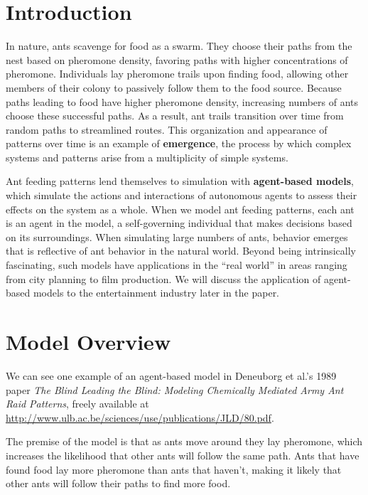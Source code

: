 
\newcommand\upquote[1]{\textquotesingle#1\textquotesingle}


\section{Introduction}

In nature, ants scavenge for food as a swarm. They choose their paths from the nest based on pheromone density, favoring paths with higher concentrations of pheromone.  Individuals lay pheromone trails upon finding food, allowing other members of their colony to passively follow them to the food source.  Because paths leading to food have higher pheromone density, increasing numbers of ants choose these successful paths.  As a result, ant trails transition over time from random paths to streamlined routes.  This organization and appearance of patterns over time is an example of \textbf{emergence},  the process by which complex systems and patterns arise from a multiplicity of simple systems.

Ant feeding patterns lend themselves to simulation with \textbf{agent-based models}, which simulate  the actions and interactions of autonomous agents  to assess their effects on the system as a whole.  When we model ant feeding patterns, each ant is an agent in the model, a self-governing individual that makes decisions based on its surroundings.  When simulating large numbers of ants,  behavior emerges that is reflective of ant behavior in the natural world.  Beyond being intrinsically fascinating, such models have applications in the ``real world'' in areas ranging from city planning to film production.  We will discuss the application of agent-based models to the entertainment industry later in the paper.

\section{Model Overview}

We can see one example of an agent-based model in Deneuborg et al.'s 1989 paper \emph{The Blind Leading the Blind: Modeling Chemically Mediated Army Ant Raid Patterns}, freely available at  \url{http://www.ulb.ac.be/sciences/use/publications/JLD/80.pdf}.

The premise of the model is that as ants move around they lay pheromone, which increases the likelihood that other ants will follow the same path. Ants that have found food lay more pheromone than ants that haven't, making it likely that other ants will follow their paths to find more food. 

